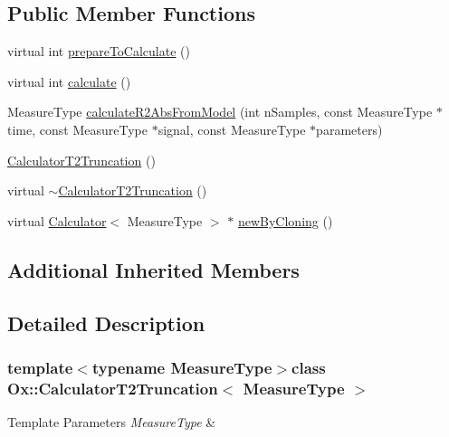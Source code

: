 \subsection*{Public Member Functions}
\begin{DoxyCompactItemize}
\item 
virtual int \hyperlink{class_ox_1_1_calculator_t2_truncation_a87a5d80163f3909658498c341c7c1a7a}{prepare\-To\-Calculate} ()
\item 
virtual int \hyperlink{class_ox_1_1_calculator_t2_truncation_a90077df2125150b62324c83da464b02b}{calculate} ()
\item 
Measure\-Type \hyperlink{class_ox_1_1_calculator_t2_truncation_a7dba06e66ae1dc710f9af18af68107db}{calculate\-R2\-Abs\-From\-Model} (int n\-Samples, const Measure\-Type $\ast$time, const Measure\-Type $\ast$signal, const Measure\-Type $\ast$parameters)
\item 
\hyperlink{class_ox_1_1_calculator_t2_truncation_a3f9e6e96cebf84643a055aef0ffb3630}{Calculator\-T2\-Truncation} ()
\item 
virtual \hyperlink{class_ox_1_1_calculator_t2_truncation_a7f5dabe2ee97aae7b67941023d92fdd6}{$\sim$\-Calculator\-T2\-Truncation} ()
\item 
virtual \hyperlink{class_ox_1_1_calculator}{Calculator}$<$ Measure\-Type $>$ $\ast$ \hyperlink{class_ox_1_1_calculator_t2_truncation_a6accdab54ee98182f12707786a461c20}{new\-By\-Cloning} ()
\end{DoxyCompactItemize}
\subsection*{Additional Inherited Members}


\subsection{Detailed Description}
\subsubsection*{template$<$typename Measure\-Type$>$class Ox\-::\-Calculator\-T2\-Truncation$<$ Measure\-Type $>$}


\begin{DoxyTemplParams}{Template Parameters}
{\em Measure\-Type} & \\
\hline
\end{DoxyTemplParams}


